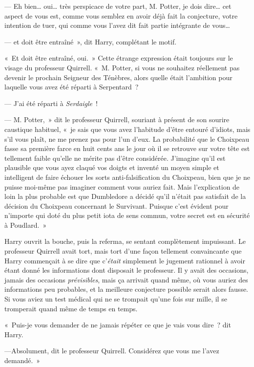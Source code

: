--- Eh bien… oui… très perspicace de votre part, M. Potter, je dois dire… cet aspect de vous est, comme vous semblez en avoir déjà fait la conjecture, votre intention de tuer, qui comme vous l'avez dit fait partie intégrante de vous…

--- et doit être entraîné~», dit Harry, complétant le motif.

«~Et doit être entraîné, oui.~» Cette étrange expression était toujours sur le visage du professeur Quirrell. «~M. Potter, si vous ne souhaitez réellement pas devenir le prochain Seigneur des Ténèbres, alors quelle était l'ambition pour laquelle vous avez été réparti à Serpentard~?

--- J'ai été réparti à \emph{Serdaigle}~!

--- M. Potter,~» dit le professeur Quirrell, souriant à présent de son sourire caustique habituel, «~je sais que vous avez l'habitude d'être entouré d'idiots, mais s'il vous plaît, ne me prenez pas pour l'un d'eux. La probabilité que le Choixpeau fasse sa première farce en huit cents ans le jour où il se retrouve sur votre tête est tellement faible qu'elle ne mérite pas d'être considérée. J'imagine qu'il est plausible que vous ayez claqué vos doigts et inventé un moyen simple et intelligent de faire échouer les sorts anti-falsification du Choixpeau, bien que je ne puisse moi-même pas imaginer comment vous auriez fait. Mais l'explication de loin la plus probable est que Dumbledore a décidé qu'il n'était pas satisfait de la décision du Choixpeau concernant le Survivant. Puisque c'est évident pour n'importe qui doté du plus petit iota de sens commun, votre secret est en sécurité à Poudlard.~»

Harry ouvrit la bouche, puis la referma, se sentant complètement impuissant. Le professeur Quirrell avait tort, mais tort d'une façon tellement convaincante que Harry commençait à se dire que c'\emph{était} simplement le jugement rationnel à avoir étant donné les informations dont disposait le professeur. Il y avait des occasions, jamais des occasions \emph{prévisibles}, mais ça arrivait quand même, où vous auriez des informations peu probables, et la meilleure conjecture possible serait alors fausse. Si vous aviez un test médical qui ne se trompait qu'une fois sur mille, il se tromperait quand même de temps en temps.

«~Puis-je vous demander de ne jamais répéter ce que je vais vous dire~? dit Harry.

---Absolument, dit le professeur Quirrell. Considérez que vous me l'avez demandé.~»

